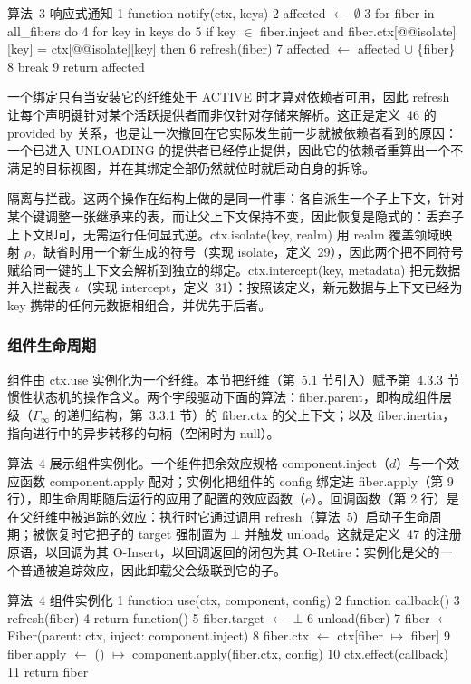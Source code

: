 \documentclass[
  10
]{article}
\begin{document}
算法~3 响应式通知
1 function notify(ctx, keys)
2 affected $\leftarrow$ $\emptyset$
3 for fiber in all\_fibers do
4 for key in keys do
5 if key $\in$ fiber.inject and fiber.ctx{[}@@isolate{]}{[}key{]} = ctx{[}@@isolate{]}{[}key{]} then
6 refresh(fiber)
7 affected $\leftarrow$ affected $\cup$ \{fiber\}
8 break
9 return affected

一个绑定只有当安装它的纤维处于 ACTIVE 时才算对依赖者可用，因此 refresh 让每个声明键针对某个活跃提供者而非仅针对存储来解析。这正是定义~46 的 provided by 关系，也是让一次撤回在它实际发生前一步就被依赖者看到的原因：一个已进入 UNLOADING 的提供者已经停止提供，因此它的依赖者重算出一个不满足的目标视图，并在其绑定全部仍然就位时就启动自身的拆除。

隔离与拦截。这两个操作在结构上做的是同一件事：各自派生一个子上下文，针对某个键调整一张继承来的表，而让父上下文保持不变，因此恢复是隐式的：丢弃子上下文即可，无需运行任何显式逆。ctx.isolate(key, realm) 用 realm 覆盖领域映射 \(\rho\)，缺省时用一个新生成的符号（实现 isolate，定义~29），因此两个把不同符号赋给同一键的上下文会解析到独立的绑定。ctx.intercept(key, metadata) 把元数据并入拦截表 \(\iota\)（实现 intercept，定义~31）：按照该定义，新元数据与上下文已经为 key 携带的任何元数据相组合，并优先于后者。

\subsubsection{组件生命周期} \label{component-lifecycle}

组件由 ctx.use 实例化为一个纤维。本节把纤维（第~5.1 节引入）赋予第~4.3.3 节惯性状态机的操作含义。两个字段驱动下面的算法：fiber.parent，即构成组件层级（\(\Gamma _ { \infty }\) 的递归结构，第~3.3.1 节）的 fiber.ctx 的父上下文；以及 fiber.inertia，指向进行中的异步转移的句柄（空闲时为 null）。

算法~4 展示组件实例化。一个组件把余效应规格 component.inject（\(d\)）与一个效应函数 component.apply 配对；实例化把组件的 config 绑定进 fiber.apply（第 9 行），即生命周期随后运行的应用了配置的效应函数（\(e\)）。回调函数（第 2 行）是在父纤维中被追踪的效应：执行时它通过调用 refresh（算法~5）启动子生命周期；被恢复时它把子的 target 强制置为 $\bot$ 并触发 unload。这就是定义~47 的注册原语，以回调为其 O-Insert，以回调返回的闭包为其 O-Retire：实例化是父的一个普通被追踪效应，因此卸载父会级联到它的子。

算法~4 组件实例化
1 function use(ctx, component, config)
2 function callback()
3 refresh(fiber)
4 return function()
5 fiber.target $\leftarrow$ $\bot$
6 unload(fiber)
7 fiber $\leftarrow$ Fiber(parent: ctx, inject: component.inject)
8 fiber.ctx $\leftarrow$ ctx{[}fiber $\mapsto$ fiber{]}
9 fiber.apply $\leftarrow$ () $\mapsto$ component.apply(fiber.ctx, config)
10 ctx.effect(callback)
11 return fiber
\end{document}
